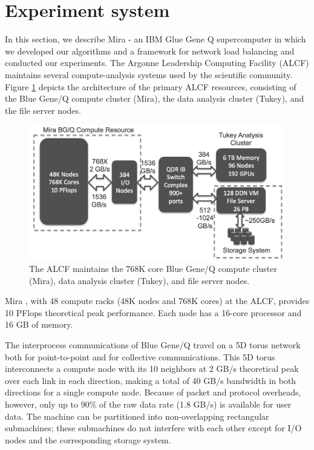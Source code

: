 \section{Experiment system}
\label{sec:system}

In this section, we describe Mira - an IBM Glue Gene Q supercomputer in which we developed our algorithms and a framework for network load balancing and conducted our experiments. The Argonne Leadership Computing Facility (ALCF) maintains several compute-analysis systems used by the scientific community. Figure \ref{fig:alcf} depicts the architecture of the primary ALCF resources, consisting of the Blue Gene/Q compute cluster (Mira), the data analysis cluster (Tukey), and the file server nodes.

\begin{figure}[!htb]
\vspace{-0.1in}
\centering
\includegraphics[scale=0.2]{figures/anl_facility.png}
\vspace{-0.1in}
\caption{The ALCF maintains the 768K core Blue Gene/Q compute cluster (Mira), data analysis cluster (Tukey), and file server nodes.}
\vspace{-0.1in}
\label{fig:alcf}
\end{figure}


Mira \cite{Chen:BGQ}, with 48 compute racks (48K nodes and 768K cores) at the ALCF, provides 10 PFlops theoretical peak performance. Each node has a 16-core processor and 16 GB of memory.

The interprocess communications of Blue Gene/Q travel on a 5D torus network both for point-to-point and for collective communications. This 5D torus interconnects a compute node with its 10 neighbors at 2 GB/s theoretical peak over each link in each direction, making a total of 40 GB/s bandwidth in both directions for a single compute node. Because of packet and protocol overheads, however, only up to 90\% of the raw data rate (1.8 GB/s) is available for user data. The machine can be partitioned into non-overlapping rectangular submachines; these submachines do not interfere with each other except for I/O nodes and the corresponding storage system.

